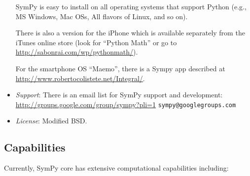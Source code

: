 \documentclass[12pt]{article}
\begin{document}
\begin{itemize}
SymPy is easy to install on all operating systems that 
support Python (e.g., MS Windows, Mac OSs, All flavors of Linux, and
so on).

There is also a version for the iPhone which is available separately
from the iTunes online store (look for ``Python Math'' or
go to \url{http://sabonrai.com/wp/pythonmath/}).

For the smartphone OS ``Maemo'', there is a Sympy app described at
\url{http://www.robertocolistete.net/Integral/}.


\item
{\it Support}:
\newline
There is an email list for SymPy support and development:
\newline
\url{http://groups.google.com/group/sympy?pli=1}
\newline
{\tt sympy@googlegroups.com}


\item
{\it License}:
\newline
Modified BSD. 

\end{itemize}



\subsection{Capabilities}

Currently, SymPy core has extensive computational capabilities including:
\end{document}
